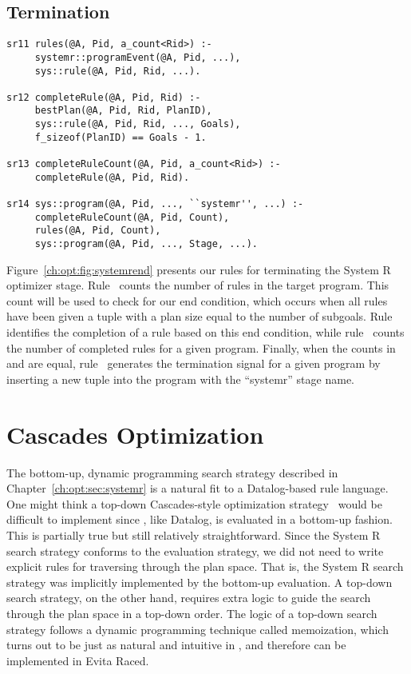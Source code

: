 \subsection{Termination}
\label{ch:opt:sec:termination}

\begin{figure*}
\ssp
\centering
\begin{lstlisting}
sr11 rules(@A, Pid, a_count<Rid>) :-
     systemr::programEvent(@A, Pid, ...),
     sys::rule(@A, Pid, Rid, ...).

sr12 completeRule(@A, Pid, Rid) :-
     bestPlan(@A, Pid, Rid, PlanID),
     sys::rule(@A, Pid, Rid, ..., Goals),
     f_sizeof(PlanID) == Goals - 1.

sr13 completeRuleCount(@A, Pid, a_count<Rid>) :-
     completeRule(@A, Pid, Rid).

sr14 sys::program(@A, Pid, ..., ``systemr'', ...) :-
     completeRuleCount(@A, Pid, Count),
     rules(@A, Pid, Count),
     sys::program(@A, Pid, ..., Stage, ...).
\end{lstlisting}
\caption{\label{ch:opt:fig:systemrend}System R termination rules.}
\end{figure*}

Figure~\ref{ch:opt:fig:systemrend} presents our rules for terminating the
System R optimizer stage.  Rule~ counts the number of rules in the target
program.  This count will be used to check for our end condition, which occurs
when all rules have been given a  tuple with a plan size equal to
the number of subgoals.  Rule~ identifies the completion of a rule based
on this end condition, while rule~ counts the number of completed rules
for a given program.  Finally, when the counts in  and
 are equal, rule~ generates the termination signal for a given
program by inserting a new tuple into the  program with the ``systemr''
stage name.

\section{Cascades Optimization}
\label{ch:opt:sec:cascades}

The bottom-up, dynamic programming search strategy described in
Chapter~\ref{ch:opt:sec:systemr} is a natural fit to a Datalog-based rule
language.  One might think a top-down Cascades-style optimization
strategy~\cite{cascades} would be difficult to implement since \OVERLOG, like
Datalog, is evaluated in a bottom-up fashion.  This is partially true but still
relatively straightforward.  Since the System R search strategy conforms to the
\OVERLOG evaluation strategy, we did not need to write explicit rules for
traversing through the plan space.  That is, the System R search strategy was
implicitly implemented by the \OVERLOG bottom-up evaluation.  A top-down search
strategy, on the other hand, requires extra logic to guide the search through
the plan space in a top-down order.  The logic of a top-down search strategy
follows a dynamic programming technique called memoization, which turns out to
be just as natural and intuitive in \OVERLOG, and therefore can be implemented
in Evita Raced.

